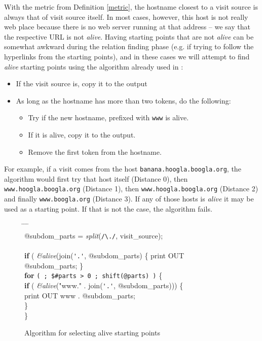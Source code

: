 \documentclass[a4paper]{danarticle}
\theoremstyle{remark}
\begin{document}
       With the metric from Definition \ref{metric}, the hostname closest to a
       visit source is always that of visit source itself. In most cases,
       however, this host is not really web place because there is no web server
       running at that address -- we say that the respective URL is not
       \textit{alive}. Having starting points that are not \textit{alive} can
       be somewhat awkward during the relation finding phase (e.g. if trying to
       follow the hyperlinks from the starting points), and in these cases we
       will attempt to find \textit{alive} starting points using the algorithm
       already used in \cite{webaware}:
       
       \begin{itemize}
         \item{If the visit source is, copy it to the output}
	 \item{As long as the hostname has more than two tokens, do the
	 following:}
	 \begin{itemize}
	   \item{Try if the new hostname, prefixed with \verb$www$ is alive.}
	   \item{If it is alive, copy it to the output.}
	   \item{Remove the first token from the hostname.}
	 \end{itemize}
       \end{itemize}
       
       For example, if a visit comes from the host
       \verb$banana.hoogla.boogla.org$, the algorithm would first try that
       host itself (Distance 0), then \verb$www.hoogla.boogla.org$ (Distance 1),
       then \verb$www.hoogla.boogla.org$ (Distance 2) and finally
       \verb$www.boogla.org$ (Distance 3). If any of those hosts is
       \textit{alive} it may be used as a starting point. If that is not the
       case, the algorithm fails.
       \begin{figure}[ht]
       {\ttfamily
       \begin{tabbing}
           \hspace{5mm} \= \hspace{5mm} \= \hspace{5mm} \= \hspace{5mm} \= \\
	   @subdom\_parts = \textit{split}(\verb$/\./$, visit\_source); \\
	   \\
	   \textbf{if} ( \textit{\&alive}(join(\verb$'.'$, @subdom\_parts) \{
	   print OUT @subdom\_parts; \} \\
	   \textbf{for} \verb-( ; $#parts > 0 ; shift(@parts) )- \{ \\
	   \>  \textbf{if} ( \textit{\&alive}("www." . join(\verb$'.'$,
    	   @subdom\_parts))) \{ \\
	   \> \> print OUT www . @subdom\_parts; \\
	   \> \} \\
	   \} \\
         \end{tabbing}}
	 \caption{Algorithm for selecting alive starting points}
	 \label{domaintest}
       \end{figure}
\end{document}
